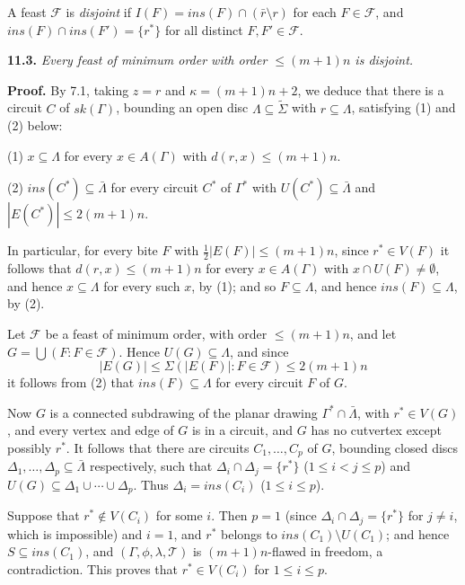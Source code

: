 A feast $\mathscr{F}$ is \textit{disjoint} if $I(F) = ins(F) \cap (\bar{r} \setminus r)$ for each $F \in \mathscr{F}$, and $ins(F) \cap ins(F') = \{r^*\}$ for all distinct $F, F' \in \mathscr{F}$.

\textbf{11.3.} \textit{Every feast of minimum order with order $\le (m + 1)n$ is disjoint.}

\textbf{Proof.} By 7.1, taking $z = r$ and $\kappa = (m + 1)n + 2$, we deduce that there is a circuit $C$ of $sk(\Gamma)$, bounding an open disc $\Lambda \subseteq \tilde{\Sigma}$ with $r \subseteq \Lambda$, satisfying (1) and (2) below:

\hspace*{12pt}(1) $x \subseteq \Lambda$ for every $x \in A(\Gamma)$ with $d(r, x) \le (m + 1)n$.

\hspace*{12pt}(2) $ins(C^*) \subseteq \bar{\Lambda}$ for every circuit $C^*$ of $\Gamma^*$ with $U(C^*) \subseteq \bar{\Lambda}$ and $|E(C^*)| \le 2(m + 1)n$.

In particular, for every bite $F$ with $\frac{1}{2}|E(F)| \le (m + 1)n$, since $r^* \in V(F)$ it follows that $d(r, x) \le (m + 1)n$ for every $x \in A(\Gamma)$ with $x \cap U(F) \ne \emptyset$, and hence $x \subseteq \Lambda$ for every such $x$, by (1); and so $F \subseteq \Lambda$, and hence $ins(F) \subseteq \Lambda$, by (2).

Let $\mathscr{F}$ be a feast of minimum order, with order $\le (m + 1)n$, and let $G = \bigcup(F : F \in \mathscr{F})$. Hence $U(G) \subseteq \Lambda$, and since
\begin{equation*}
|E(G)| \le \Sigma(|E(F)| : F \in \mathscr{F}) \le 2(m + 1)n
\end{equation*}
it follows from (2) that $ins(F) \subseteq \Lambda$ for every circuit $F$ of $G$.

Now $G$ is a connected subdrawing of the planar drawing $\Gamma^* \cap \bar{\Lambda}$, with $r^* \in V(G)$, and every vertex and edge of $G$ is in a circuit, and $G$ has no cutvertex except possibly $r^*$. It follows that there are circuits $C_1, \dots, C_p$ of $G$, bounding closed discs $\Delta_1, \dots, \Delta_p \subseteq \bar{\Lambda}$ respectively, such that $\Delta_i \cap \Delta_j = \{r^*\}$ ($1 \le i < j \le p$) and $U(G) \subseteq \Delta_1 \cup \cdots \cup \Delta_p$. Thus $\Delta_i = ins(C_i)$ ($1 \le i \le p$).

Suppose that $r^* \notin V(C_i)$ for some $i$. Then $p = 1$ (since $\Delta_i \cap \Delta_j = \{r^*\}$ for $j \ne i$, which is impossible) and $i = 1$, and $r^*$ belongs to $ins(C_1) \setminus U(C_1)$; and hence $S \subseteq ins(C_1)$, and $(\Gamma, \phi, \lambda, \mathscr{T})$ is $(m + 1)n$-flawed in freedom, a contradiction. This proves that $r^* \in V(C_i)$ for $1 \le i \le p$.

